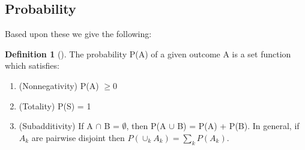 \documentclass[10pt,]{book}
\theoremstyle{plain}
\theoremstyle{definition}
\newtheorem{definition}[theorem]{Definition}
\theoremstyle{definition}
\theoremstyle{definition}
\numberwithin{equation}{section}
\begin{document}
\subsection[{Probability}]{Probability}\label{subsection-9}
Based upon these we give the following:%
\begin{definition}[{}]\label{DefnProb}
The probability P(A) of a given outcome A is a set function which satisfies:
			\leavevmode%
\begin{enumerate}
\item\hypertarget{li-108}{}(Nonnegativity) P(A) \(\ge 0\)%
\item\hypertarget{li-109}{}(Totality) P(S) = 1%
\item\hypertarget{li-110}{}(Subadditivity) If A \(\cap\) B = \(\emptyset\), then P(A \(\cup\) B) = P(A) + P(B).  
				In general, if {\(A_k\)} are pairwise disjoint then \(P( \cup_k A_k) = \sum_k P(A_k)\).%
\end{enumerate}
\end{definition}
\typeout{************************************************}
\typeout{************************************************}
\end{document}

